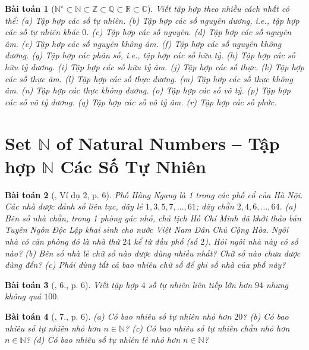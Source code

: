 \documentclass{article}
\newtheorem{baitoan}{Bài toán}
\begin{document}
\begin{baitoan}[$\mathbb{N}^\star\subset\mathbb{N}\subset\mathbb{Z}\subset\mathbb{Q}\subset\mathbb{R}\subset\mathbb{C}$]
	Viết tập hợp theo nhiều cách nhất có thể: (a) Tập hợp các số tự nhiên. (b) Tập hợp các số nguyên dương, i.e., tập hợp các số tự nhiên khác $0$. (c) Tập hợp các số nguyên. (d) Tập hợp các số nguyên âm. (e) Tập hợp các số nguyên không âm. (f) Tập hợp các số nguyên không dương. (g) Tập hợp các phân số, i.e., tập hợp các số hữu tỷ. (h) Tập hợp các số hữu tỷ dương. (i) Tập hợp các số hữu tỷ âm. (j) Tập hợp các số thực. (k) Tập hợp các số thực âm. (l) Tập hợp các số thực dương. (m) Tập hợp các số thực không âm. (n) Tập hợp các thực không dương. (o) Tập hợp các số vô tỷ. (p) Tập hợp các số vô tỷ dương. (q) Tập hợp các số vô tỷ âm. (r) Tập hợp các số phức.
\end{baitoan}


\section{Set $\mathbb{N}$ of Natural Numbers -- Tập hợp $\mathbb{N}$ Các Số Tự Nhiên}

\begin{baitoan}[\cite{Tuyen_Toan_6}, Ví dụ 2, p. 6]
	Phố Hàng Ngang là 1 trong các phố cổ của Hà Nội. Các nhà được đánh số liên tục, dãy lẻ $1,3,5,7,\ldots,61$; dãy chẵn $2,4,6,\ldots,64$. (a) Bên số nhà chẵn, trong 1 phòng gác nhỏ, chủ tịch Hồ Chí Minh đã khởi thảo bản Tuyên Ngôn Độc Lập khai sinh cho nước Việt Nam Dân Chủ Cộng Hòa. Ngôi nhà có căn phòng đó là nhà thứ $24$ kể từ đầu phố (số $2$). Hỏi ngôi nhà này có số nào? (b) Bên số nhà lẻ chữ số nào được dùng nhiều nhất? Chữ số nào chưa được dùng đến? (c) Phải dùng tất cả bao nhiêu chữ số để ghi số nhà của phố này?
\end{baitoan}

\begin{baitoan}[\cite{Tuyen_Toan_6}, 6., p. 6]
	Viết tập hợp $4$ số tự nhiên liên tiếp lớn hơn $94$ nhưng không quá $100$.
\end{baitoan}

\begin{baitoan}[\cite{Tuyen_Toan_6}, 7., p. 6]
	(a) Có bao nhiêu số tự nhiên nhỏ hơn $20$? (b) Có bao nhiêu số tự nhiên nhỏ hơn $n\in\mathbb{N}$? (c) Có bao nhiêu số tự nhiên chẵn nhỏ hơn $n\in\mathbb{N}$? (d) Có bao nhiêu số tự nhiên lẻ nhỏ hơn $n\in\mathbb{N}$?
\end{baitoan}
\end{document}
